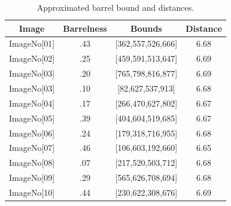\documentclass[a4paper]{article}
\begin{document}
\begin{table}
\centering
\begin{tabular}{|c|c|c|c|}
Image & Barrelness & Bounds & Distance \\\hline
ImageNo[01] & .43 & [362,557,526,666] & 6.68 \\
ImageNo[02] & .25 & [459,591,513,647] & 6.69\\
ImageNo[03] & .20 & [765,798,816,877] & 6.69\\
ImageNo[03] & .10 & [82,627,537,913]  & 6.68\\
ImageNo[04] & .17 & [266,470,627,802] & 6.67\\
ImageNo[05] & .39 & [404,604,519,685] & 6.67\\
ImageNo[06] & .24 & [179,318,716,955] & 6.68\\
ImageNo[07] & .46 & [106,603,192,660] & 6.65\\
ImageNo[08] & .07 & [217,520,503,712] & 6.68\\
ImageNo[09] & .29 & [565,626,708,694] & 6.68\\
ImageNo[10] & .44 & [230,622,308,676] & 6.69
\end{tabular}
\caption{\label{tab:bound_distance_table}Approximated barrel bound and distances.}
\end{table}
\end{document}
